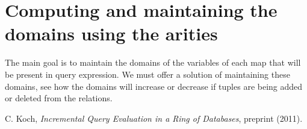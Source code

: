 \documentclass[12pt]{article}
\begin{document}
%

\section{Computing and maintaining the domains using the arities}

The main goal is to maintain the domains of the variables of each map that will be present in query expression. We must offer a solution of maintaining these domains, see how the domains will increase or decrease if tuples are being added or deleted from the relations.

\begin{thebibliography}{9}
 C. Koch, \emph{Incremental Query Evaluation in a Ring of Databases},  preprint (2011).
\end{thebibliography}
\end{document}
